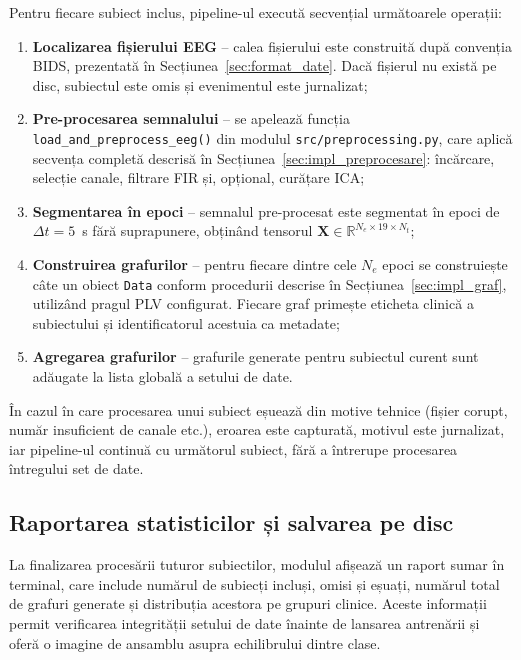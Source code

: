\documentclass[12pt,a4paper]{report}
\theoremstyle{definition}
\theoremstyle{remark}
\begin{document}
Pentru fiecare subiect inclus, pipeline-ul execută secvențial următoarele operații:

\begin{enumerate}
    \item \textbf{Localizarea fișierului EEG} -- calea fișierului este construită după convenția BIDS, prezentată în Secțiunea~\ref{sec:format_date}. Dacă fișierul nu există pe disc, subiectul este omis și evenimentul este jurnalizat;
    \item \textbf{Pre-procesarea semnalului} -- se apelează funcția \texttt{load\_and\_preprocess\_eeg()} din modulul \texttt{src/preprocessing.py}, care aplică secvența completă descrisă în Secțiunea~\ref{sec:impl_preprocesare}: încărcare, selecție canale, filtrare FIR și, opțional, curățare ICA;
    \item \textbf{Segmentarea în epoci} -- semnalul pre-procesat este segmentat în epoci de $\Delta t = 5$~s fără suprapunere, obținând tensorul $\mathbf{X} \in \mathbb{R}^{N_e \times 19 \times N_t}$;
    \item \textbf{Construirea grafurilor} -- pentru fiecare dintre cele $N_e$ epoci se construiește câte un obiect \texttt{Data} conform procedurii descrise în Secțiunea~\ref{sec:impl_graf}, utilizând pragul PLV configurat. Fiecare graf primește eticheta clinică a subiectului și identificatorul acestuia ca metadate;
    \item \textbf{Agregarea grafurilor} -- grafurile generate pentru subiectul curent sunt adăugate la lista globală a setului de date.
\end{enumerate}

În cazul în care procesarea unui subiect eșuează din motive tehnice (fișier corupt, număr insuficient de canale etc.), eroarea este capturată, motivul este jurnalizat, iar pipeline-ul continuă cu următorul subiect, fără a întrerupe procesarea întregului set de date.

\subsection{Raportarea statisticilor și salvarea pe disc}

La finalizarea procesării tuturor subiectilor, modulul afișează un raport sumar în terminal, care include numărul de subiecți incluși, omisi și eșuați, numărul total de grafuri generate și distribuția acestora pe grupuri clinice. Aceste informații permit verificarea integrității setului de date înainte de lansarea antrenării și oferă o imagine de ansamblu asupra echilibrului dintre clase.
\end{document}
